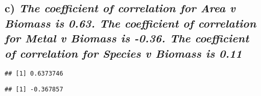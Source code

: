 \documentclass[
]{article}
\newenvironment{Shaded}{\begin{snugshade}}{\end{snugshade}}
\newcommand{\CommentTok}[1]{\textcolor[rgb]{0.56,0.35,0.01}{\textit{#1}}}
\newcommand{\FunctionTok}[1]{\textcolor[rgb]{0.00,0.00,0.00}{#1}}
\newcommand{\NormalTok}[1]{#1}
\newcommand{\SpecialCharTok}[1]{\textcolor[rgb]{0.00,0.00,0.00}{#1}}
\begin{document}
\hypertarget{c-the-coefficient-of-correlation-for-area-v-biomass-is-0.63.-the-coefficient-of-correlation-for-metal-v-biomass-is--0.36.-the-coefficient-of-correlation-for-species-v-biomass-is-0.11}{%
\subsection{\texorpdfstring{c) \emph{The coefficient of correlation for
Area v Biomass is 0.63. The coefficient of correlation for Metal v
Biomass is -0.36. The coefficient of correlation for Species v Biomass
is
0.11}}{c) The coefficient of correlation for Area v Biomass is 0.63. The coefficient of correlation for Metal v Biomass is -0.36. The coefficient of correlation for Species v Biomass is 0.11}}\label{c-the-coefficient-of-correlation-for-area-v-biomass-is-0.63.-the-coefficient-of-correlation-for-metal-v-biomass-is--0.36.-the-coefficient-of-correlation-for-species-v-biomass-is-0.11}}

\begin{Shaded}
\end{Shaded}

\begin{verbatim}
## [1] 0.6373746
\end{verbatim}

\begin{Shaded}
\end{Shaded}

\begin{verbatim}
## [1] -0.367857
\end{verbatim}

\begin{Shaded}
\end{Shaded}
\end{document}
